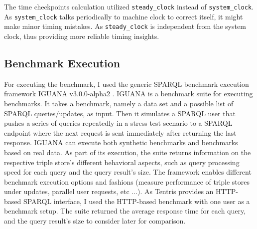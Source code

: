 The time checkpoints calculation utilized \verb|steady_clock| instead of \verb|system_clock|.
As \verb|system_clock| talks periodically to machine clock to correct itself, it might make minor timing mistakes. As \verb|steady_clock| is independent from the system clock, thus providing more reliable timing insights. 
 
\subsection{Benchmark Execution}
For executing the benchmark, I used the generic SPARQL benchmark execution framework IGUANA v3.0.0-alpha2 \cite{conrads-2017-iguana-demo}. 
IGUANA is a benchmark suite for executing benchmarks. 
It takes a benchmark, namely a data set and a possible list of SPARQL queries/updates, as input. 
Then it simulates a SPARQL user that pushes a series of queries repeatedly in a stress test scenario to a SPARQL endpoint where the next request is sent immediately after returning the last response. 
IGUANA can execute both synthetic benchmarks and benchmarks based on real data.
As part of its execution, the suite returns information on the respective triple store's different behavioral aspects, such as query processing speed for each query and the query result's size. 
The framework enables different benchmark execution options and fashions (measure performance of triple stores under updates, parallel user requests, etc ...). 
As Tentris provides an HTTP-based SPARQL interface, I used the HTTP-based benchmark with one user as a benchmark setup. 
The suite returned the average response time for each query, and the query result's size to consider later for comparison.  \\

